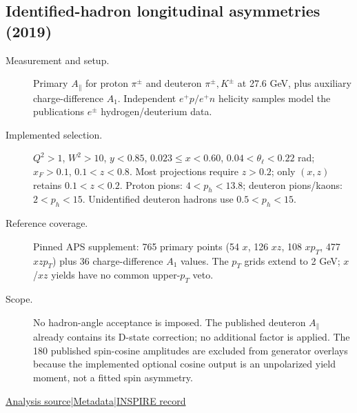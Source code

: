 \documentclass[11pt,a4paper]{article}
\newcommand{\id}[1]{{\small\texttt{\detokenize{#1}}}}
\begin{document}
\subsection{\texorpdfstring{Identified-hadron longitudinal asymmetries (2019)}{Identified-hadron longitudinal asymmetries (2019)}}
\id{HERMES_2019_I1698889}\quad\cite{r1698889}
\begin{description}
\item[Measurement and setup.] Primary $A_\parallel$ for proton $\pi^\pm$ and deuteron $\pi^\pm,K^\pm$ at 27.6 GeV, plus auxiliary charge-difference $A_1$. Independent $e^+p/e^+n$ helicity samples model the publication\textquotesingle s $e^\pm$ hydrogen/deuterium data.
\item[Implemented selection.] $Q^2>1$, $W^2>10$, $y<0.85$, $0.023\le x<0.60$, $0.04<\theta_\ell<0.22$ rad; $x_F>0.1$, $0.1<z<0.8$. Most projections require $z>0.2$; only $(x,z)$ retains $0.1<z<0.2$. Proton pions: $4<p_h<13.8$; deuteron pions/kaons: $2<p_h<15$. Unidentified deuteron hadrons use $0.5<p_h<15$.
\item[Reference coverage.] Pinned APS supplement: 765 primary points (54 $x$, 126 $xz$, 108 $xp_T$, 477 $xzp_T$) plus 36 charge-difference $A_1$ values. The $p_T$ grids extend to 2 GeV; $x$/$xz$ yields have no common upper-$p_T$ veto.
\item[Scope.] No hadron-angle acceptance is imposed. The published deuteron $A_\parallel$ already contains its D-state correction; no additional factor is applied. The 180 published spin-cosine amplitudes are excluded from generator overlays because the implemented optional cosine output is an unpolarized yield moment, not a fitted spin asymmetry.
\end{description}
{\small\href{https://github.com/apapaefs/HerwigPolarizedPheno/blob/105045bd757aaa6b217e87811dc5f9a22a8d1cef/analyses/rivet/dis/HERMES_2019_I1698889.cc}{Analysis source}\quad|\quad\href{https://github.com/apapaefs/HerwigPolarizedPheno/blob/105045bd757aaa6b217e87811dc5f9a22a8d1cef/analyses/rivet/dis/HERMES_2019_I1698889.info}{Metadata}\quad|\quad\href{https://inspirehep.net/literature/1698889}{INSPIRE record}}
\end{document}
